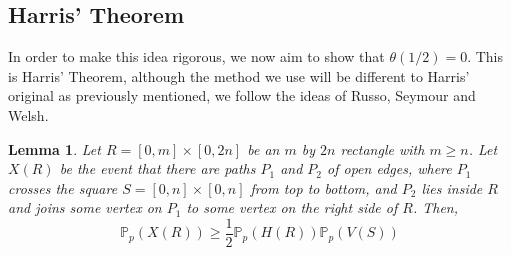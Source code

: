 \documentclass[a4paper,11pt]{article}
\newtheorem{lemma}[theorem]{Lemma}
\theoremstyle{definition}
\newcommand{\prob}{\mathbb{P}_p}
\begin{document}
\subsection{Harris' Theorem}

In order to make this idea rigorous, we now aim to show that $\theta(1/2) = 0$. This is Harris' Theorem, although the method we use will be different to Harris' original as previously mentioned, we follow the ideas of Russo, Seymour and Welsh.

\begin{lemma}\label{mby2nLemma}
	Let $R = [0,m]\times[0,2n]$ be an $m$ by $2n$ rectangle with $m\geq n$. Let $X(R)$ be the event that there are paths $P_1$ and $P_2$ of open edges, where $P_1$ crosses the square $S = [0,n]\times[0,n]$ from top to bottom, and $P_2$ lies inside $R$ and joins some vertex on $P_1$ to some vertex on the right side of $R$. Then, 
	$$\prob(X(R))\geq \frac{1}{2}\prob(H(R))\prob(V(S))$$
\end{lemma}
\end{document}

